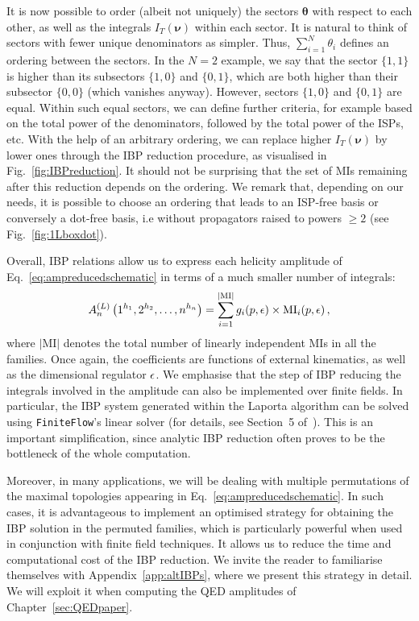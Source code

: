 \documentclass[main.tex]{subfiles}
\begin{document}
It is now possible to order (albeit not uniquely) the sectors $\bm{\theta}$ with respect to each other, as well as the integrals $I_T(\bm{\nu})$ within each sector. It is natural to think of sectors with fewer unique denominators as simpler. Thus, $\sum_{i=1}^N \theta_i$ defines an ordering between the sectors. In the $N=2$ example, we say that the sector $\{1, 1\}$ is higher than its subsectors $\{1, 0\}$ and $\{0, 1\}$, which are both higher than their subsector $\{0, 0\}$ (which vanishes anyway). However, sectors $\{1, 0\}$ and $\{0, 1\}$ are equal. Within such equal sectors, we can define further criteria, for example based on the total power of the denominators, followed by the total power of the ISPs, etc. With the help of an arbitrary ordering, we can replace higher $I_T(\bm{\nu})$ by lower ones through the IBP reduction procedure, as visualised in Fig.~\ref{fig:IBPreduction}. It should not be surprising that the set of MIs remaining after this reduction depends on the ordering. We remark that, depending on our needs, it is possible to choose an ordering that leads to an ISP-free basis or conversely a dot-free basis, i.e without propagators raised to powers $\ge 2$ (see Fig.~\ref{fig:1Lboxdot}).

Overall, IBP relations allow us to express each helicity amplitude of Eq.~\ref{eq:ampreducedschematic} in terms of a much smaller number of integrals:
\begin{equation} \label{eq:ampafterIBP}
    	A_n^{(L)} \left(1^{h_1}, 2^{h_2}, \ldots, n^{h_n} \right) =  
     \sum_{i=1}^{|\text{MI}|} g_i(p, \epsilon) \times \text{MI}_i(p,\epsilon)\,,
\end{equation}
where $|\text{MI}|$ denotes the total number of linearly independent MIs in all the families. Once again, the coefficients are functions of external kinematics, as well as the dimensional regulator $\epsilon$. We emphasise that the step of IBP reducing the integrals involved in the amplitude can also be implemented over finite fields. In particular, the IBP system generated within the Laporta algorithm can be solved using \texttt{FiniteFlow}'s linear solver (for details, see Section~5 of~\cite{Peraro:2019svx}). This is an important simplification, since analytic IBP reduction often proves to be the bottleneck of the whole computation.

Moreover, in many applications, we will be dealing with multiple permutations of the maximal topologies appearing in Eq.~\ref{eq:ampreducedschematic}. In such cases, it is advantageous to implement an optimised strategy for obtaining the IBP solution in the permuted families, which is particularly powerful when used in conjunction with finite field techniques. It allows us to reduce the time and computational cost of the IBP reduction. We invite the reader to familiarise themselves with Appendix~\ref{app:altIBPs}, where we present this strategy in detail. We will exploit it when computing the QED amplitudes of Chapter~\ref{sec:QEDpaper}.
\end{document}
